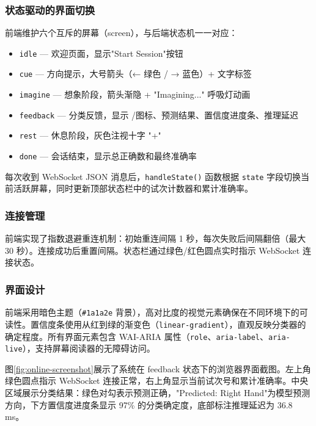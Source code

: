 \subsubsection{状态驱动的界面切换}

前端维护六个互斥的屏幕（screen），与后端状态机一一对应：

\begin{itemize}[leftmargin=2em]
	\item \texttt{idle} — 欢迎页面，显示"Start Session"按钮
	\item \texttt{cue} — 方向提示，大号箭头（← 绿色 / → 蓝色）+ 文字标签
	\item \texttt{imagine} — 想象阶段，箭头渐隐 + "Imagining..." 呼吸灯动画
	\item \texttt{feedback} — 分类反馈，显示 \checkmark/\texttimes 图标、预测结果、置信度进度条、推理延迟
	\item \texttt{rest} — 休息阶段，灰色注视十字 "+"
	\item \texttt{done} — 会话结束，显示总正确数和最终准确率
\end{itemize}

每次收到 WebSocket JSON 消息后，\texttt{handleState()} 函数根据 \texttt{state} 字段切换当前活跃屏幕，同时更新顶部状态栏中的试次计数器和累计准确率。

\subsubsection{连接管理}

前端实现了指数退避重连机制：初始重连间隔 1 秒，每次失败后间隔翻倍（最大 30 秒）。连接成功后重置间隔。状态栏通过绿色/红色圆点实时指示 WebSocket 连接状态。

\subsubsection{界面设计}

前端采用暗色主题（\texttt{\#1a1a2e} 背景），高对比度的视觉元素确保在不同环境下的可读性。置信度条使用从红到绿的渐变色（\texttt{linear-gradient}），直观反映分类器的确定程度。所有界面元素包含 WAI-ARIA 属性（\texttt{role}、\texttt{aria-label}、\texttt{aria-live}），支持屏幕阅读器的无障碍访问。

图\ref{fig:online-screenshot}展示了系统在 feedback 状态下的浏览器界面截图。左上角绿色圆点指示 WebSocket 连接正常，右上角显示当前试次号和累计准确率。中央区域展示分类结果：绿色对勾表示预测正确，"Predicted: Right Hand"为模型预测方向，下方置信度进度条显示 97\% 的分类确定度，底部标注推理延迟为 36.8\,ms。

